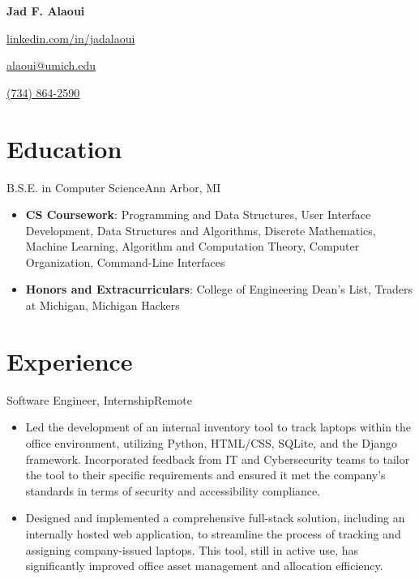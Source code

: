 \documentclass[letterpaper,10.5pt]{article}
\begin{document}
\begin{center}
    \Huge{\textbf{Jad F. Alaoui}}

    \begin{itemize*}
        \item[] \href{https://linkedin.com/in/jadalaoui}{linkedin.com/in/jadalaoui}
        \item \href{mailto:alaoui@umich.edu}{alaoui@umich.edu}
        \item \href{tel:+17348642590}{(734) 864-2590}
    \end{itemize*}
\end{center}

\section{Education}
{B.S.E. in Computer Science}{Ann Arbor, MI}
\begin{itemize}
    \item \textbf{CS Coursework}: Programming and Data Structures, User Interface Development, Data Structures and Algorithms, Discrete Mathematics, Machine
          Learning, Algorithm and Computation Theory, Computer Organization, Command-Line Interfaces
    \item \textbf{Honors and Extracurriculars}: College of Engineering Dean's List, Traders at Michigan, Michigan Hackers
\end{itemize}

\section{Experience}
{Software Engineer, Internship}{Remote}
\begin{itemize}
    \item Led the development of an internal inventory tool to track laptops within the office environment, utilizing Python, HTML/CSS, SQLite, and the Django framework. Incorporated feedback from IT and Cybersecurity teams to tailor the tool to their specific requirements and ensured it met the company's standards in terms of security and accessibility compliance.
    
    \item Designed and implemented a comprehensive full-stack solution, including an internally hosted web application, to streamline the process of tracking and assigning company-issued laptops. This tool, still in active use, has significantly improved office asset management and allocation efficiency.
\end{itemize}
\end{document}
